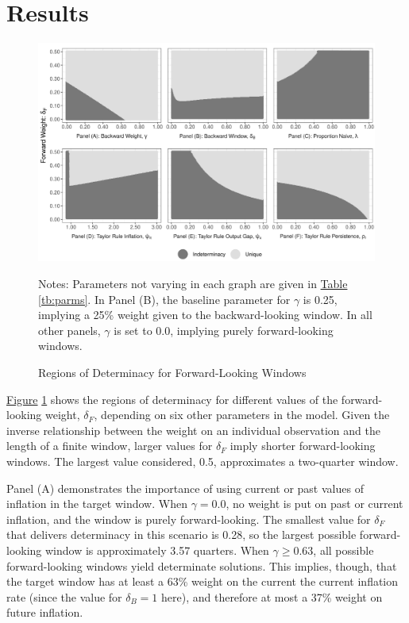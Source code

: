 \documentclass[english,authoryear,12pt]{elsarticle}
\begin{document}
\section{\label{Results}Results}

\begin{figure}
	\captionsetup{justification=centering}
	\begin{center}
		\includegraphics[width=\textwidth]{./determinacy_notitle.png}
		\vspace*{3pc}\hspace*{2pc}\parbox{0.9\textwidth}{\small{
			Notes: Parameters not varying in each graph are given in \href{tb:parms}{Table} \ref{tb:parms}. In Panel (B), the baseline parameter for $\gamma$ is 0.25, implying a 25\% weight given to the backward-looking window. In all other panels, $\gamma$ is set to 0.0, implying purely forward-looking windows.}
		}
	\end{center}
	\vspace*{-4pc}\caption{Regions of Determinacy for Forward-Looking Windows}\label{fg:determinacy}
\end{figure}

\href{fg:determinacy}{Figure} \ref{fg:determinacy} shows the regions of determinacy for different values of the forward-looking weight, $\delta_F$, depending on six other parameters in the model. Given the inverse relationship between the weight on an individual observation and the length of a finite window, larger values for $\delta_F$ imply shorter forward-looking windows. The largest value considered, 0.5, approximates a two-quarter window.

Panel (A) demonstrates the importance of using current or past values of inflation in the target window. When $\gamma=0.0$, no weight is put on past or current inflation, and the window is purely forward-looking. The smallest value for $\delta_F$ that delivers determinacy in this scenario is 0.28, so the largest possible forward-looking window is approximately 3.57 quarters. When $\gamma \geq 0.63$, all possible forward-looking windows yield determinate solutions. This implies, though, that the target window has at least a 63\% weight on the current the current inflation rate (since the value for $\delta_B=1$ here), and therefore at most a 37\% weight on future inflation.
\end{document}

